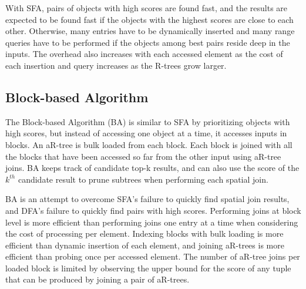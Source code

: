 With SFA, pairs of objects with high scores are found fast, and the results are expected to be found fast if the objects with the highest scores are close to each other. Otherwise, many entries have to be dynamically inserted and many range queries have to be performed if the objects among best pairs reside deep in the inputs. The overhead also increases with each accessed element as the cost of each insertion and query increases as the R-trees grow larger.

\subsection{Block-based Algorithm}

The Block-based Algorithm (BA) is similar to SFA by prioritizing objects with high scores, but instead of accessing one object at a time, it accesses inputs in blocks. An aR-tree is bulk loaded from each block. Each block is joined with all the blocks that have been accessed so far from the other input using aR-tree joins. BA keeps track of candidate top-k results, and can also use the score of the \(k^{th}\) candidate result to prune subtrees when performing each spatial join.

BA is an attempt to overcome SFA's failure to quickly find spatial join results, and DFA's failure to quickly find pairs with high scores. Performing joins at block level is more efficient than performing joins one entry at a time when considering the cost of processing per element. Indexing blocks with bulk loading is more efficient than dynamic insertion of each element, and joining aR-trees is more efficient than probing once per accessed element. The number of aR-tree joins per loaded block is limited by observing the upper bound for the score of any tuple that can be produced by joining a pair of aR-trees.
